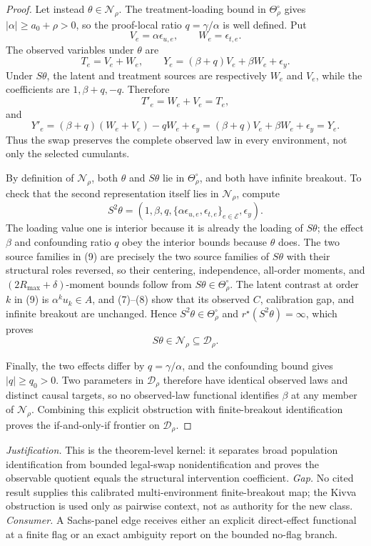 \documentclass{article}
\begin{document}
\begin{proof}
Let instead \(\theta\in\mathcal N_\rho\).  The treatment-loading bound in \(\Theta_\rho^\circ\) gives \(|\alpha|\geq a_0+\rho>0\), so the proof-local ratio \(q=\gamma/\alpha\) is well defined.  Put
\[
 V_e=\alpha\epsilon_{u,e},
 \qquad W_e=\epsilon_{t,e}.
\]
The observed variables under \(\theta\) are
\[
 T_e=V_e+W_e,
 \qquad
 Y_e=(\beta+q)V_e+\beta W_e+\epsilon_y.                                   \tag{7}
\]
Under \(S\theta\), the latent and treatment sources are respectively \(W_e\) and \(V_e\), while the coefficients are \(1,\beta+q,-q\).  Therefore
\[
 T'_e=W_e+V_e=T_e,
\]
and
\[
 Y'_e=(\beta+q)(W_e+V_e)-qW_e+\epsilon_y
     =(\beta+q)V_e+\beta W_e+\epsilon_y=Y_e.                              \tag{8}
\]
Thus the swap preserves the complete observed law in every environment, not only the selected cumulants.

By definition of \(\mathcal N_\rho\), both \(\theta\) and \(S\theta\) lie in \(\Theta_\rho^\circ\), and both have infinite breakout.  To check that the second representation itself lies in \(\mathcal N_\rho\), compute
\[
 S^2\theta
 =\left(1,\beta,q,
   \{\alpha\epsilon_{u,e},\epsilon_{t,e}\}_{e\in\mathcal E},\epsilon_y\right).       \tag{9}
\]
The loading value one is interior because it is already the loading of \(S\theta\); the effect \(\beta\) and confounding ratio \(q\) obey the interior bounds because \(\theta\) does.  The two source families in (9) are precisely the two source families of \(S\theta\) with their structural roles reversed, so their centering, independence, all-order moments, and \((2R_{\max}+\delta)\)-moment bounds follow from \(S\theta\in\Theta_\rho^\circ\).  The latent contrast at order \(k\) in (9) is \(\alpha^ku_k\in A\), and (7)--(8) show that its observed \(C\), calibration gap, and infinite breakout are unchanged.  Hence \(S^2\theta\in\Theta_\rho^\circ\) and \(r^\star(S^2\theta)=\infty\), which proves
\[
 S\theta\in\mathcal N_\rho\subseteq\mathcal D_\rho.
\]

Finally, the two effects differ by \(q=\gamma/\alpha\), and the confounding bound gives \(|q|\geq q_0>0\).  Two parameters in \(\mathcal D_\rho\) therefore have identical observed laws and distinct causal targets, so no observed-law functional identifies \(\beta\) at any member of \(\mathcal N_\rho\).  Combining this explicit obstruction with finite-breakout identification proves the if-and-only-if frontier on \(\mathcal D_\rho\).
\end{proof}
\par\smallskip\noindent \textit{Justification.} This is the theorem-level kernel: it separates broad population identification from bounded legal-swap nonidentification and proves the observable quotient equals the structural intervention coefficient. \textit{Gap.} No cited result supplies this calibrated multi-environment finite-breakout map; the Kivva obstruction is used only as pairwise context, not as authority for the new class. \textit{Consumer.} A Sachs-panel edge receives either an explicit direct-effect functional at a finite flag or an exact ambiguity report on the bounded no-flag branch.
\end{document}
